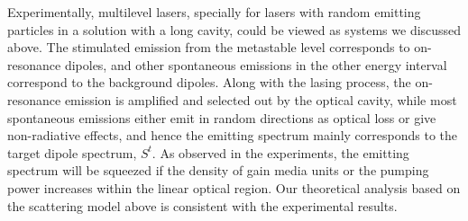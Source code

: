 Experimentally, multilevel lasers, specially for lasers with random emitting particles in a solution with a long cavity, could be viewed as systems we discussed above. The stimulated emission from the metastable level corresponds to on-resonance dipoles, and other spontaneous emissions in the other energy interval correspond to the background dipoles. Along with the lasing process, the on-resonance emission is amplified and selected out by the optical cavity, while most spontaneous emissions either emit in random directions as optical loss or give non-radiative effects, and hence the emitting spectrum mainly corresponds to the target dipole spectrum, $S^t$. As observed in the experiments, the emitting spectrum will be squeezed if the density of gain media units or the pumping power increases within the linear optical region. Our theoretical analysis based on the scattering model above is consistent with the experimental results.


\clearpage





